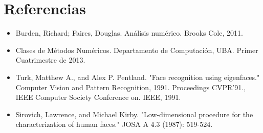 \section{Referencias}

\begin{itemize}
  \item \nocite {Burden} Burden, Richard; Faires, Douglas. An\'alisis 
num\'erico. Brooks Cole, 2011.
  \item \nocite {MN} Clases de M\'etodos Num\'ericos. Departamento de 
Computaci\'on, UBA. Primer Cuatrimestre de 2013.
\item \nocite {Turk91} Turk, Matthew A., and Alex P. Pentland. "Face recognition using eigenfaces." Computer Vision and Pattern Recognition, 1991. Proceedings CVPR'91., IEEE Computer Society Conference on. IEEE, 1991.
\item \nocite {Sirovich87} Sirovich, Lawrence, and Michael Kirby. "Low-dimensional procedure for the characterization of human faces." JOSA A 4.3 (1987): 519-524.
\end{itemize}
